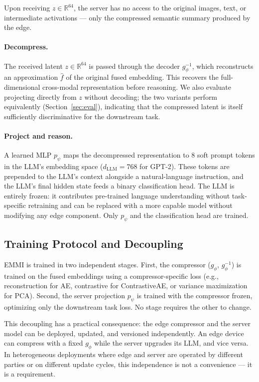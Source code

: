 \documentclass[10pt,twocolumn]{article}
\begin{document}
Upon receiving $z \in \mathbb{R}^{64}$, the server has no access to
the original images, text, or intermediate activations --- only the
compressed semantic summary produced by the edge.

\paragraph{Decompress.}
The received latent $z \in \mathbb{R}^{64}$ is passed through the
decoder $g_\phi^{-1}$, which reconstructs an approximation $\hat{f}$
of the original fused embedding. This recovers the full-dimensional
cross-modal representation before reasoning. We also evaluate projecting
directly from $z$ without decoding; the two variants perform
equivalently (Section~\ref{sec:eval}), indicating that the compressed
latent is itself sufficiently discriminative for the downstream task.

\paragraph{Project and reason.}
A learned MLP $p_\psi$ maps the decompressed representation to 8 soft
prompt tokens in the LLM's embedding space ($d_\text{LLM}{=}768$ for
GPT-2). These tokens are prepended to the LLM's context alongside a
natural-language instruction, and the LLM's final hidden state feeds a
binary classification head. The LLM is entirely frozen: it contributes
pre-trained language understanding without task-specific retraining and
can be replaced with a more capable model without modifying any edge
component. Only $p_\psi$ and the classification head are trained.

\subsection{Training Protocol and Decoupling}

EMMI is trained in two independent stages. First, the compressor
($g_\phi$, $g_\phi^{-1}$) is trained on the fused embeddings using
a compressor-specific loss (e.g., reconstruction for AE, contrastive
for ContrastiveAE, or variance maximization for PCA). Second, the
server projection $p_\psi$ is trained with the compressor frozen,
optimizing only the downstream task loss. No stage requires the other
to change.

This decoupling has a practical consequence: the edge compressor and the
server model can be deployed, updated, and versioned independently.
An edge device can compress with a fixed $g_\phi$ while the server
upgrades its LLM, and vice versa. In heterogeneous deployments where
edge and server are operated by different parties or on different update
cycles, this independence is not a convenience --- it is a requirement.
\end{document}
